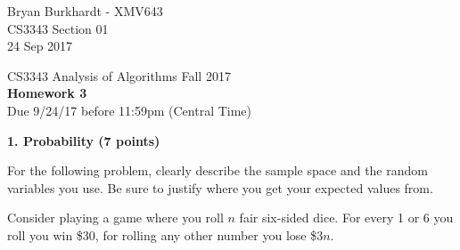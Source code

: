 \documentclass[12pt]{elsart}
\begin{document}
\pagestyle{empty}
Bryan Burkhardt - XMV643\\
CS3343 Section 01\\
24 Sep 2017\\

\begin{center}
\Large  CS3343 Analysis of Algorithms Fall 2017 \\
\large {\bf Homework 3}\\
\normalsize Due 9/24/17 before 11:59pm (Central Time)
\end{center}

{\bf 1.  Probability (7 points)}

For the following problem, clearly describe the sample space and the random variables you use.  Be sure to justify where you get your expected values from.

Consider playing a game where you roll $n$ fair six-sided dice.  For every 1 or 6 you roll you win \$30, for rolling any other number you lose \$$3 n$.
\end{document}
